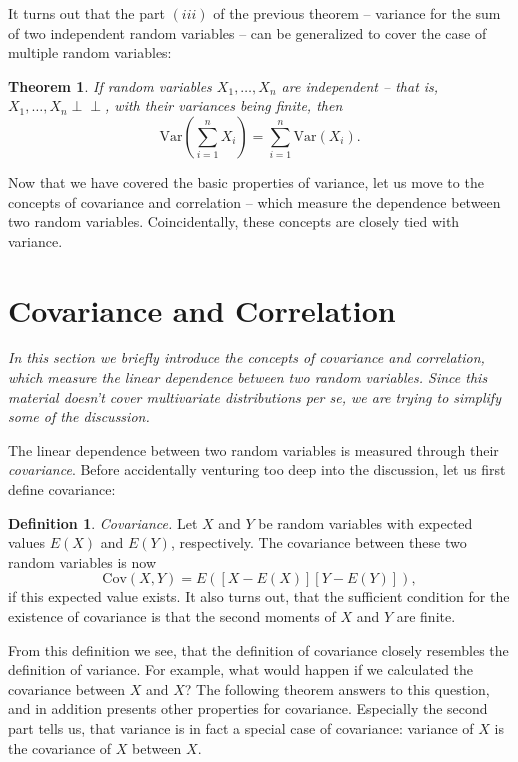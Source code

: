 \documentclass[12pt,a4paper,leqno]{report}
\newcommand{\var}{\mathrm{Var}}
\newcommand{\cov}{\mathrm{Cov}}
\def\independent{\perp\!\!\!\perp}
\theoremstyle{plain}
\newtheorem{lause}[equation]{Theorem}
\theoremstyle{definition}
\newtheorem{maar}[equation]{Definition}
\begin{document}
It turns out that the part $(iii)$ of the previous theorem -- variance for the sum of two independent random variables -- can be generalized to cover the case of multiple random variables:

\begin{lause}
If random variables $X_1, \dots ,X_n$ are independent -- that is, $X_1, \dots ,X_n \independent$, with their variances being finite, then
\[
\var\left(\sum_{i=1}^n X_i \right) = \sum_{i=1}^n \var(X_i).
\]
\end{lause}

Now that we have covered the basic properties of variance, let us move to the concepts of covariance and correlation -- which measure the dependence between two random variables. Coincidentally, these concepts are closely tied with variance.

\section{Covariance and Correlation}

\emph{In this section we briefly introduce the concepts of covariance and correlation, which measure the linear dependence between two random variables. Since this material doesn't cover multivariate distributions per se, we are trying to simplify some of the discussion.}

The linear dependence between two random variables is measured through their \emph{covariance}. Before accidentally venturing too deep into the discussion, let us first define covariance:

\begin{maar} \label{maar:covariance}
\emph{Covariance.} Let $X$ and $Y$ be random variables with expected values $E(X)$ and $E(Y)$, respectively. The covariance between these two random variables is now 
\[
\cov(X,Y) = E([X - E(X)][Y - E(Y)]),
\]
if this expected value exists. It also turns out, that the sufficient condition for the existence of covariance is that the second moments of $X$ and $Y$ are finite.
\end{maar}

From this definition we see, that the definition of covariance closely resembles the definition of variance. For example, what would happen if we calculated the covariance between $X$ and $X$? The following theorem answers to this question, and in addition presents other properties for covariance. Especially the second part tells us, that variance is in fact a special case of covariance: variance of $X$ is the covariance of $X$ between $X$.
\end{document}
